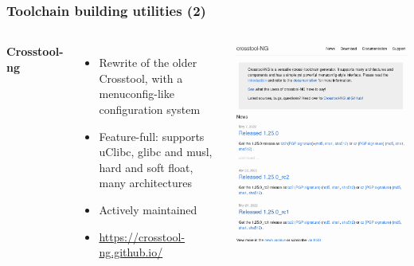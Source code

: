 \begin{frame}
  \frametitle{Toolchain building utilities (2)}
  \begin{columns}
    {\bf Crosstool-ng}
    \begin{itemize}
      \item Rewrite of the older Crosstool, with a menuconfig-like configuration
	system
      \item Feature-full: supports uClibc, glibc and musl,
            hard and soft float, many architectures
      \item Actively maintained
      \item \url{https://crosstool-ng.github.io/}
    \end{itemize}
    \includegraphics[width=\textwidth]{slides/sysdev-toolchains-obtaining/crosstool-ng.png}
  \end{columns}
\end{frame}

